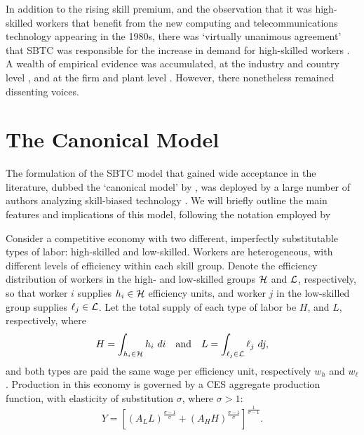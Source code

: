 In addition to the rising skill premium, and the observation that it was high-skilled workers that benefit from the new computing and telecommunications technology appearing in the 1980s, there was `virtually unanimous agreement' that SBTC was responsible for the increase in demand for high-skilled workers \citep[p.41]{Johnson1997}. A wealth of empirical evidence was accumulated, at the industry and country level \citep{Berman1994,Autor1998,Berman1998}, and at the firm and plant level \citep{Levy1996,Bresnahan2002}. However, there nonetheless remained dissenting voices.

\section{The Canonical Model}\label{sec:canonical}

The formulation of the SBTC model that gained wide acceptance in the literature, dubbed the `canonical model' by \citet{Acemoglu2011}, was deployed by a large number of authors analyzing skill-biased technology \citep[e.g.]{Katz1992,Katz1999,Goldin2007,Acemoglu2011}.
We will briefly outline the main features and implications of this model, following the notation employed by \citet{Acemoglu2011}

Consider a competitive economy with two different, imperfectly substitutable types of labor: high-skilled and low-skilled. Workers are heterogeneous, with different levels of efficiency within each skill group. Denote the efficiency distribution of workers in the high- and low-skilled groups $\mathcal{H}$ and $\mathcal{L}$, respectively, so that worker $i$ supplies $h_i\in\mathcal{H}$ efficiency units, and worker $j$ in the low-skilled group supplies $\ell_j\in\mathcal{L}$. Let the total supply of each type of labor be $H$, and $L$, respectively, where
$$
    H = \int_{h_i \in \sH} h_i\ di \quad\text{and}\quad L = \int_{\ell_j \in \sL} \ell_j\ dj,
$$
and both types are paid the same wage per efficiency unit, respectively $w_h$ and $w_\ell$. Production in this economy is governed by a CES aggregate production function, with elasticity of substitution $\sigma$, where $\sigma>1$:
\begin{equation}  \label{eq:prod}
Y = \left[
  \left(A_LL \right)^\frac{\sigma-1}{\sigma}
  +
  \left(A_HH \right)^\frac{\sigma-1}{\sigma}
  \right]^\frac{1}{\sigma-1}.
\end{equation}

